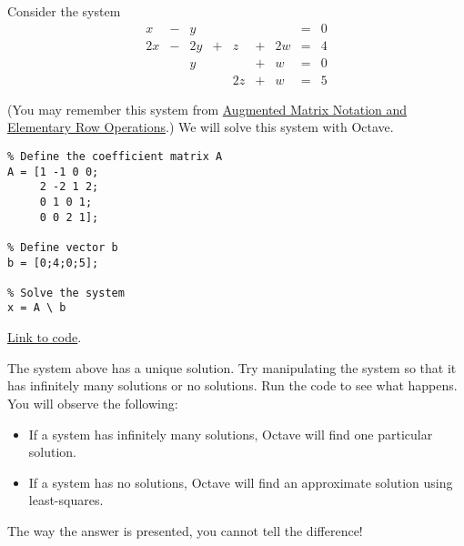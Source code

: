 \documentclass{ximera}
\begin{document}
\begin{example}\label{temp:systems1}
Consider the system
\begin{equation}
\begin{array}{ccccccccc}
      x &- &y&&&&&= &0 \\
	 2x& -&2y&+&z&+&2w&=&4\\
     & &y&&&+&w&=&0\\
     & &&&2z&+&w&=&5
    \end{array}
    \end{equation}

 (You may remember this system from \href{https://ximera.osu.edu/linearalgebrav3/LinearAlgebraInteractiveIntro/SYS-0020/main}{Augmented Matrix Notation and Elementary Row Operations}.)  We will solve this system with Octave.   
\begin{verbatim}
% Define the coefficient matrix A
A = [1 -1 0 0;
     2 -2 1 2;
     0 1 0 1;
     0 0 2 1];

% Define vector b
b = [0;4;0;5];

% Solve the system 
x = A \ b
\end{verbatim}

\href{https://sagecell.sagemath.org/?z=eJxFjsEKwjAQRO-B_Ye59FjYBD0FDwH_wGP1YMIGA7aBNpT69yZIcG-PeczsgKvEtAjKSxCyxJhCkqVgfpY1HXCkHC6YNEYNBltSaGcwGmiYzowW6z9yVfSjMqmhb-wSSl7hSfnWyfZk2Z67dMvv_ffH9tmKzCB1VM3hDv8FLh8nkA==&lang=octave&interacts=eJyLjgUAARUAuQ==}{Link to code}.

\begin{warning}
    The system above has a unique solution.  Try manipulating the system so that it has infinitely many solutions or no solutions.  Run the code to see what happens.  You will observe the following:

\begin{itemize}
    \item If a system has infinitely many solutions, Octave will find one particular solution.
    \item If a system has no solutions, Octave will find an approximate solution using least-squares.  %
\end{itemize}
The way the answer is presented, you cannot tell the difference!
\end{warning}

\end{example}
\end{document}
